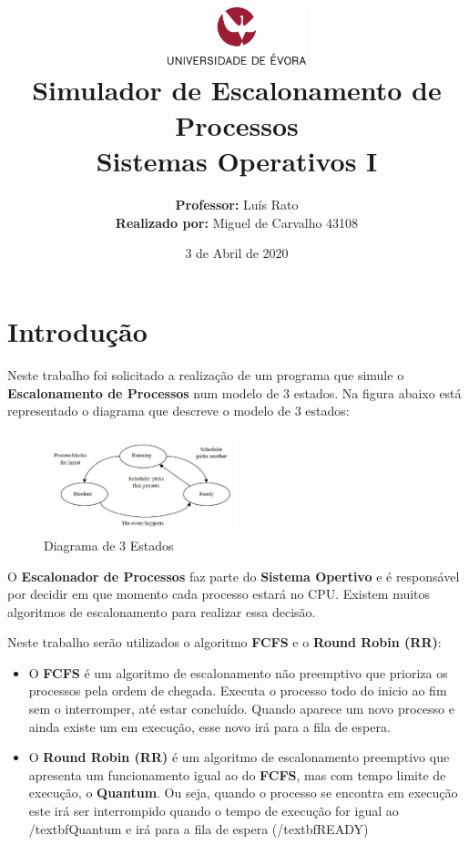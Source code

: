 \documentclass[11pt]{article}   %
\title
{
    \includegraphics[width=0.3\textwidth]{images/logo_universidade.png}
    \\[0.1cm]
    \textbf{Simulador de Escalonamento de Processos} \\
    Sistemas Operativos I
}
\author
{
    \textbf{Professor:} Luís Rato \\
    \textbf{Realizado por:} Miguel de Carvalho 43108 
}
\date{3 de Abril de 2020}
\begin{document}
\maketitle

\section{Introdução} 

\hspace{0,5cm}Neste trabalho foi solicitado a realização de um programa que simule o \textbf{Escalonamento de Processos} num modelo de 3 estados. Na figura abaixo está representado o diagrama que descreve o modelo de 3 estados:\par
\begin{figure}[h!]
    \begin{center}
        \includegraphics[width=0.5\textwidth]{images/states.png}
        \caption{Diagrama de 3 Estados}
    \end{center}
\end{figure}
O \textbf{Escalonador de Processos} faz parte do \textbf{Sistema Opertivo} e é responsável por decidir em que momento cada processo estará no CPU. 
Existem muitos algoritmos de escalonamento para realizar essa decisão. \par
Neste trabalho serão utilizados o algoritmo \textbf{FCFS} e o \textbf{Round Robin (RR)}:
\begin{itemize}
    \item O \textbf{FCFS} é um algoritmo de escalonamento não preemptivo que prioriza os processos pela ordem de chegada. Executa o processo todo do inicio ao fim sem o interromper, até estar concluído. Quando aparece um novo processo e ainda existe um em execução, esse novo irá para a fila de espera.
    \item O \textbf{Round Robin (RR)} é um algoritmo de escalonamento preemptivo que apresenta um funcionamento igual ao do \textbf{FCFS}, mas com tempo limite de execução, o \textbf{Quantum}. Ou seja, quando o processo se encontra em execução este irá ser interrompido quando o tempo de execução for igual ao /textbf{Quantum} e irá para a fila de espera (/textbf{READY}) 
\end{itemize}
\end{document}
